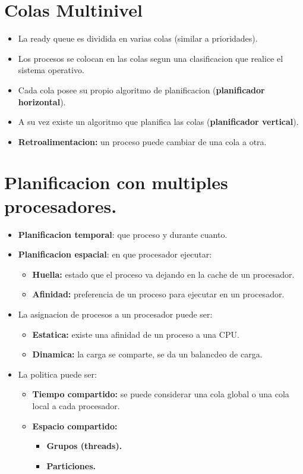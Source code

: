 \documentclass[11pt]{article}
\begin{document}
\section{Colas Multinivel}
\begin{itemize}
    \item La ready queue es dividida en varias colas (similar a prioridades).
    \item Los procesos se colocan en las colas segun una clasificacion que realice el sistema operativo.
    \item Cada cola posee su propio algoritmo de planificacion (\textbf{planificador horizontal}).
    \item A su vez existe un algoritmo que planifica las colas (\textbf{planificador vertical}).
    \item \textbf{Retroalimentacion:} un proceso puede cambiar de una cola a otra.
\end{itemize}


\section{Planificacion con multiples procesadores.}
\begin{itemize}
    \item \textbf{Planificacion temporal}: que proceso y durante cuanto.
    \item \textbf{Planificacion espacial}: en que procesador ejecutar:
    \begin{itemize}
        \item \textbf{Huella:} estado que el proceso va dejando en la cache de un procesador.
        \item \textbf{Afinidad:} preferencia de un proceso para ejecutar en un procesador.
    \end{itemize}
    \item La asignacion de procesos a un procesador puede ser:
        \begin{itemize}
            \item \textbf{Estatica:} existe una afinidad de un proceso a una CPU.
            \item \textbf{Dinamica:} la carga se comparte, se da un balancdeo de carga.
        \end{itemize}
    \item La politica puede ser:
        \begin{itemize}
            \item \textbf{Tiempo compartido:} se puede considerar una cola global o una cola local a cada procesador.
            \item \textbf{Espacio compartido:} 
                \begin{itemize}
                    \item \textbf{Grupos (threads).}
                    \item \textbf{Particiones.}
                \end{itemize}
        \end{itemize}
\end{itemize}
\end{document}
